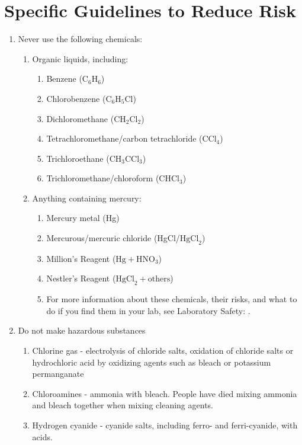 \section{Specific Guidelines to Reduce Risk}
\label{sub:specguide}
\begin{enumerate}

\item{Never use the following chemicals:}
\begin{enumerate}
\item{Organic liquids, including:}
\begin{enumerate}
\item{Benzene ($\mbox{C}_{6}\mbox{H}_{6}$)}
\item{Chlorobenzene ($\mbox{C}_{6}\mbox{H}_{5}\mbox{Cl}$)}
\item{Dichloromethane ($\mbox{CH}_{2}\mbox{Cl}_{2}$)}
\item{Tetrachloromethane/carbon tetrachloride ($\mbox{CCl}_{4}$)}
\item{Trichloroethane ($\mbox{CH}_{3}\mbox{CCl}_{3}$)}
\item{Trichloromethane/chloroform ($\mbox{CHCl}_{3}$)}
\end{enumerate}
\item{Anything containing mercury:}
\begin{enumerate}
\item{Mercury metal (Hg)}
\item{Mercurous/mercuric chloride (HgCl/$\mbox{HgCl}_{2}$)}
\item{Million's Reagent ($\mbox{Hg}+\mbox{HNO}_{3}$)}
\item{Nestler's Reagent ($\mbox{HgCl}_{2}+\mbox{others}$)}
\item{For more information about these chemicals, their risks, 
and what to do if you find them in your lab, 
see Laboratory Safety: }.
\end{enumerate}
\end{enumerate}

\item{Do not make hazardous substances}
\begin{enumerate}
\item{Chlorine gas - electrolysis of chloride salts, 
oxidation of chloride salts or hydrochloric acid 
by oxidizing agents such as bleach or potassium permanganate}
\item{Chloroamines - ammonia with bleach. People have died 
mixing ammonia and bleach together when mixing cleaning agents.}
\item{Hydrogen cyanide - cyanide salts, 
including ferro- and ferri-cyanide, with acids.}
\end{enumerate}


\end{enumerate}
